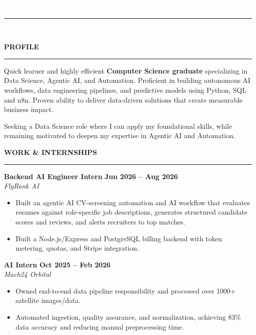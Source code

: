 \documentclass[10.5pt,a4paper]{article}
\newcommand{\cvsection}[1]{%
  \vspace{9pt}%
  {\raggedright\textbf{\large\textcolor{darkcol}{\MakeUppercase{#1}}}\par
   \vspace{1pt}\textcolor{maincol}{\rule{0.3\linewidth}{2pt}}\par}%
  \vspace{6pt}}
\newenvironment{cvbullets}
  {\begin{itemize}[leftmargin=1.2em,itemsep=2pt,topsep=0pt,parsep=0pt,partopsep=0pt]}
  {\end{itemize}}
\begin{document}
\begin{minipage}[t]{0.6\textwidth}\vspace{0pt}
\noindent\colorbox{darkcol}{\begin{minipage}[c][3.2cm][c]{\dimexpr\linewidth-2\fboxsep\relax}
  \centering
  {\huge\textbf{\textcolor{white}{SIDDHARTHA SHAKYA}}}\par\vspace{4pt}
  \textcolor{white}{\rule{0.1\linewidth}{1.25pt}}\par\vspace{6pt}
  {\large\textcolor{white}{Data Scientist \textbar{} Agentic AI \& Automation}}
\end{minipage}}

\cvsection{Profile}
\setlength{\emergencystretch}{5em}
Quick learner and highly efficient \textbf{Computer Science graduate} specializing in Data Science, Agentic AI, and Automation. Proficient in building autonomous AI workflows, data engineering pipelines, and predictive models using Python, SQL and n8n. Proven ability to deliver data-driven solutions that create measurable business impact.

\vspace{5pt}
Seeking a Data Science role where I can apply my foundational skills, while remaining motivated to deepen my expertise in Agentic AI and Automation.

\cvsection{Work \& Internships}

\textbf{Backend AI Engineer Intern} \hfill \textbf{Jun 2026 -- Aug 2026} \\
\textit{FlyRank AI}
\vspace{3pt}
\begin{cvbullets}
  \item Built an agentic AI CV-screening automation and AI workflow that evaluates resumes against role-specific job descriptions, generates structured candidate scores and reviews, and alerts recruiters to top matches. 
  \item Built a Node.js/Express and PostgreSQL billing backend with token metering, quotas, and Stripe integration.
\end{cvbullets}

\vspace{6pt}

\textbf{AI Intern} \hfill \textbf{Oct 2025 -- Feb 2026} \\
\textit{Mach24 Orbital}
\vspace{3pt}
\begin{cvbullets}
  \item Owned end-to-end data pipeline responsibility and processed over 1000+ satellite images/data.
  \item Automated ingestion, quality assurance, and normalization, achieving 83\% data accuracy and reducing manual preprocessing time.
\end{cvbullets}


\end{minipage}
\end{document}
